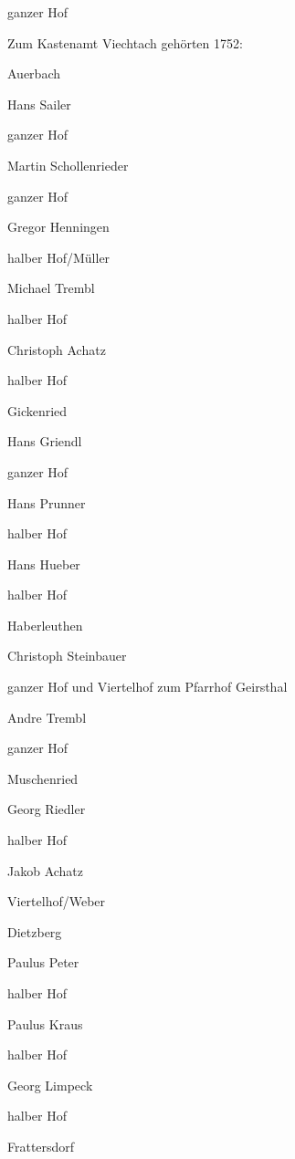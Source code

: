 ganzer Hof



Zum Kastenamt Viechtach gehörten 1752:



 Auerbach

Hans Sailer

ganzer Hof



Martin Schollenrieder

ganzer Hof



Gregor Henningen

halber Hof/Müller



Michael Trembl

halber Hof



Christoph Achatz

halber Hof

Gickenried

Hans Griendl

ganzer Hof



Hans Prunner

halber Hof



Hans Hueber

halber Hof

Haberleuthen

Christoph Steinbauer

ganzer Hof und Viertelhof zum Pfarrhof Geirsthal



Andre Trembl

ganzer Hof

Muschenried

Georg Riedler

halber Hof



Jakob Achatz

Viertelhof/Weber

Dietzberg

Paulus Peter

halber Hof



Paulus Kraus

halber Hof



Georg Limpeck

halber Hof

Frattersdorf

